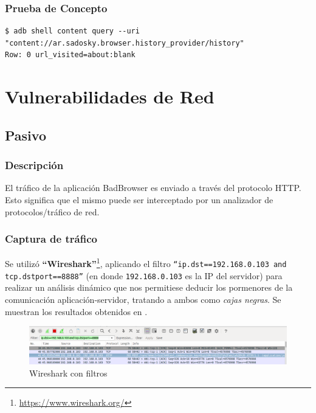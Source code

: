 \documentclass[11pt, a4paper, twoside]{article}
\begin{document}
\subsubsection{Prueba de Concepto}
\begin{verbatim}
$ adb shell content query --uri "content://ar.sadosky.browser.history_provider/history"
Row: 0 url_visited=about:blank
\end{verbatim}

%
%
\clearpage
{}
\section{Vulnerabilidades de Red}
\subsection{Pasivo}
\subsubsection{Descripción}
El tráfico de la aplicación BadBrowser es enviado a través del protocolo HTTP. Esto significa que el mismo puede ser interceptado por un analizador de protocolos/tráfico de red. 

\subsubsection{Captura de tráfico}
Se utilizó \textbf{``Wireshark''}\footnote{\url{https://www.wireshark.org/}}, aplicando el filtro \texttt{``ip.dst==192.168.0.103 and tcp.dstport==8888''} (en donde \texttt{192.168.0.103} es la IP del servidor) para realizar un análisis dinámico que nos permitiese deducir los pormenores de la comunicación aplicación-servidor, tratando a ambos como \emph{cajas negras}. Se muestran los resultados obtenidos en .

\begin{center}
\begin{figure}[H]
\includegraphics[width=\textwidth]{wireshark-filtro.png}
\caption{Wireshark con filtros}
\label{fig:wireshark-filtro}
\end{figure}
\end{center}
\end{document}
